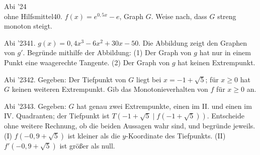 \documentclass[11pt]{article}
\begin{document}
\pfgruppe{}
\begin{pfaufg}{Abi ’24\\ohne Hilfsmittel}{40.}{}
$f(x) = e^{0{,}5x} - e$, Graph $G$. Weise nach, dass $G$ streng monoton steigt.
\end{pfaufg}
\begin{pfaufg}{Abi ’23}{41.}{}
$g(x) = 0{,}4x^3 - 6x^2 + 30x - 50$. Die Abbildung zeigt den Graphen von $g'$. Begründe mithilfe der Abbildung: (1) Der Graph von $g$ hat nur in einem Punkt eine waagerechte Tangente. (2) Der Graph von $g$ hat keinen Extrempunkt.
\par\smallskip\noindent {}\par
{}
\end{pfaufg}
\pfgruppe{}
\par\addvspace{6pt}
\begin{pfaufg}{Abi ’23}{42.}{}
Gegeben: Der Tiefpunkt von $G$ liegt bei $x = -1 + \sqrt{5}$; für $x \ge 0$ hat $G$ keinen weiteren Extrempunkt. Gib das Monotonieverhalten von $f$ für $x \ge 0$ an.
\end{pfaufg}
\pfgruppe{}
\begin{pfaufg}{Abi ’23}{43.}{}
Gegeben: $G$ hat genau zwei Extrempunkte, einen im II. und einen im IV. Quadranten; der Tiefpunkt ist $T(-1 + \sqrt{5} \mid f(-1 + \sqrt{5}))$. Entscheide ohne weitere Rechnung, ob die beiden Aussagen wahr sind, und begründe jeweils. (I) $f(-0{,}9 + \sqrt{5})$ ist kleiner als die $y$-Koordinate des Tiefpunkts. (II) $f'(-0{,}9 + \sqrt{5})$ ist größer als null.
\end{pfaufg}
\end{document}
